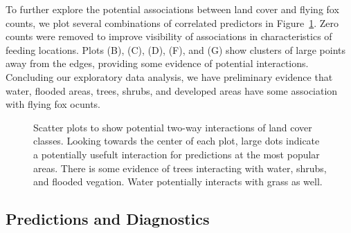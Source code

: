 \documentclass[
  12pt,
  letterpaper,
  DIV=11,
  numbers=noendperiod]{scrartcl}
\begin{document}
To further explore the potential associations between land cover and
flying fox counts, we plot several combinations of correlated predictors
in Figure~\ref{fig-scatter}. Zero counts were removed to improve
visibility of associations in characteristics of feeding locations.
Plots (B), (C), (D), (F), and (G) show clusters of large points away
from the edges, providing some evidence of potential interactions.
Concluding our exploratory data analysis, we have preliminary evidence
that water, flooded areas, trees, shrubs, and developed areas have some
association with flying fox ocunts.

\begin{figure}[H]


\caption{\label{fig-scatter}Scatter plots to show potential two-way
interactions of land cover classes. Looking towards the center of each
plot, large dots indicate a potentially usefult interaction for
predictions at the most popular areas. There is some evidence of trees
interacting with water, shrubs, and flooded vegation. Water potentially
interacts with grass as well.}

\end{figure}%

\subsection{Predictions and
Diagnostics}\label{predictions-and-diagnostics}
\end{document}
